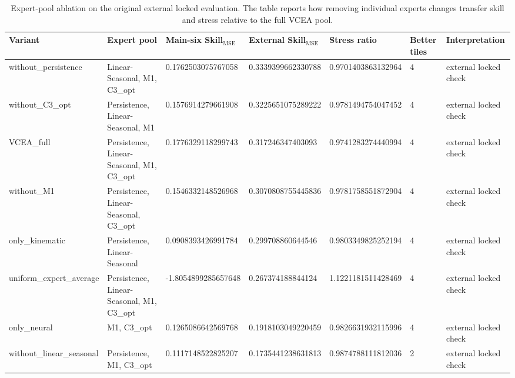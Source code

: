 \begin{table}[t]
\centering
\footnotesize
\begin{tabular}{lllllll}
\toprule
Variant & Expert pool & Main-six Skill$_{\mathrm{MSE}}$ & External Skill$_{\mathrm{MSE}}$ & Stress ratio & Better tiles & Interpretation \\
\midrule
without\_persistence & Linear-Seasonal, M1, C3\_opt & 0.1762503075767058 & 0.3339399662330788 & 0.9701403863132964 & 4 & external locked check \\
without\_C3\_opt & Persistence, Linear-Seasonal, M1 & 0.1576914279661908 & 0.3225651075289222 & 0.9781494754047452 & 4 & external locked check \\
VCEA\_full & Persistence, Linear-Seasonal, M1, C3\_opt & 0.1776329118299743 & 0.317246347403093 & 0.9741283274440994 & 4 & external locked check \\
without\_M1 & Persistence, Linear-Seasonal, C3\_opt & 0.1546332148526968 & 0.3070808755445836 & 0.9781758551872904 & 4 & external locked check \\
only\_kinematic & Persistence, Linear-Seasonal & 0.0908393426991784 & 0.299708860644546 & 0.9803349825252194 & 4 & external locked check \\
uniform\_expert\_average & Persistence, Linear-Seasonal, M1, C3\_opt & -1.8054899285657648 & 0.267374188844124 & 1.1221181511428469 & 4 & external locked check \\
only\_neural & M1, C3\_opt & 0.1265086642569768 & 0.1918103049220459 & 0.9826631932115996 & 4 & external locked check \\
without\_linear\_seasonal & Persistence, M1, C3\_opt & 0.1117148522825207 & 0.1735441238631813 & 0.9874788111812036 & 2 & external locked check \\
\bottomrule
\end{tabular}
\caption{Expert-pool ablation on the original external locked evaluation. The table reports how removing individual experts changes transfer skill and stress relative to the full VCEA pool.}
\label{tab:e2_expert_ablation_external}
\end{table}
